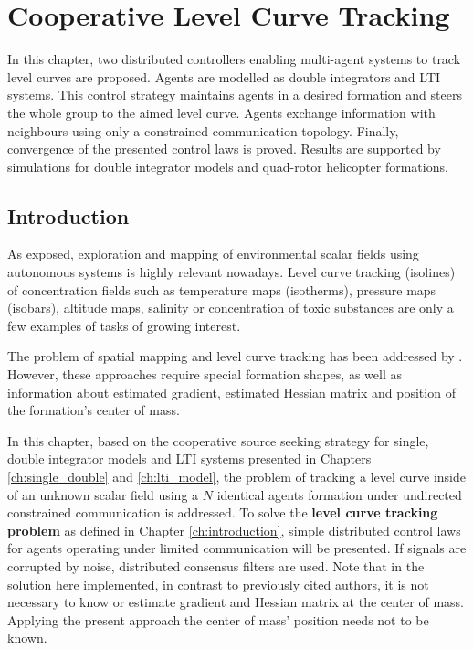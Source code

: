\chapter{Cooperative Level Curve Tracking \label{ch:levelcurves}}


In this chapter, two distributed controllers enabling multi-agent systems to track level curves are proposed.  Agents are modelled as double integrators and LTI systems.  This control strategy maintains agents in a desired formation and steers the whole group to the aimed level curve. Agents exchange information with neighbours using only a constrained communication topology. Finally,  convergence of the presented control laws is proved. Results are supported by simulations for double integrator models  and quad-rotor helicopter formations.


 

\section{Introduction}
As exposed, exploration and mapping of environmental scalar fields using autonomous systems is highly relevant nowadays. Level curve tracking (isolines) of concentration fields such as temperature maps (isotherms), pressure maps (isobars), altitude maps, salinity or concentration of toxic substances are only a few examples of tasks of growing interest. 

The problem of spatial mapping and level curve tracking has been  addressed by \citep{OgrenFiorelliLeonard04, ZhangFiorelliLeonard07, ZhangLeonard10, WilliamsSukhatme12}. However, these approaches require special formation shapes,  as well as information about estimated gradient, estimated Hessian matrix and position of the formation's center of mass.

In this chapter, based on the cooperative source seeking strategy for single, double integrator models and LTI systems presented in Chapters \ref{ch:single_double} and \ref{ch:lti_model}, the problem of tracking a level curve inside of an unknown scalar field using a $N$ identical agents formation under undirected constrained communication is addressed.  
To solve the \textbf{level curve tracking problem} as defined in Chapter \ref{ch:introduction}, simple distributed control laws for agents operating under limited communication will be presented.
If signals are corrupted by noise, distributed consensus filters are used. 
Note that in the solution here implemented, in contrast to previously cited authors, it is not necessary to know or estimate gradient and Hessian matrix at the center of mass. Applying the present approach the center of mass' position needs not to be known.



